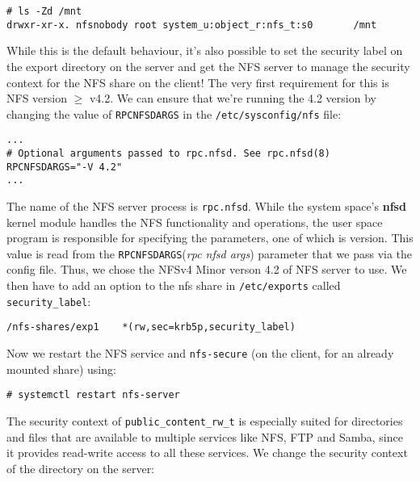 \vspace{-15pt}
\begin{verbatim}
# ls -Zd /mnt
drwxr-xr-x. nfsnobody root system_u:object_r:nfs_t:s0       /mnt
\end{verbatim}
\vspace{-10pt}	

\noindent
While this is the default behaviour, it's also possible to set the security label on the export directory on the server and get the NFS server to manage the security context for the NFS share on the client! The very first requirement for this is NFS version $\geq$ v4.2. We can ensure that we're running the 4.2 version by changing the value of \verb|RPCNFSDARGS| in the \verb|/etc/sysconfig/nfs| file:

\vspace{-15pt}
\begin{verbatim}
...
# Optional arguments passed to rpc.nfsd. See rpc.nfsd(8)
RPCNFSDARGS="-V 4.2"
...
\end{verbatim}
\vspace{-10pt}	

\noindent
The name of the NFS server process is \verb|rpc.nfsd|. While the system space's \textbf{nfsd} kernel module handles the NFS functionality and operations, the user space program is responsible for specifying the parameters, one of which is version. This value is read from the \verb|RPCNFSDARGS|(\textit{rpc nfsd args}) parameter that we pass via the config file. Thus, we chose the NFSv4 Minor verson 4.2 of NFS server to use. We then have to add an option to the nfs share in \verb|/etc/exports| called \verb|security_label|:

\vspace{-15pt}
\begin{verbatim}
/nfs-shares/exp1	*(rw,sec=krb5p,security_label)
\end{verbatim}
\vspace{-10pt}	

\noindent
Now we restart the NFS service and \verb|nfs-secure| (on the client, for an already mounted share) using:

\vspace{-15pt}
\begin{verbatim}
# systemctl restart nfs-server
\end{verbatim}
\vspace{-10pt}
The security context of \verb|public_content_rw_t| is especially suited for directories and files that are available to multiple services like NFS, FTP and Samba, since it provides read-write access to all these services. We change the security context of the directory on the server: 


